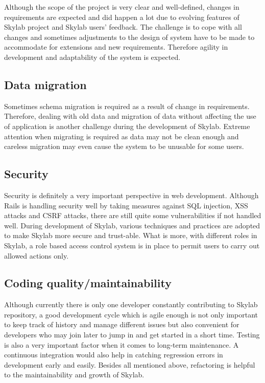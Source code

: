 Although the scope of the project is very clear and well-defined, changes in requirements are expected and did happen a lot due to evolving features of Skylab project and Skylab users' feedback. The challenge is to cope with all changes and sometimes adjustments to the design of system have to be made to accommodate for extensions and new requirements. Therefore agility in development and adaptability of the system is expected.

\subsection{Data migration}

Sometimes schema migration is required as a result of change in requirements. Therefore, dealing with old data and migration of data without affecting the use of application is another challenge during the development of Skylab. Extreme attention when migrating is required as data may not be clean enough and careless migration may even cause the system to be unusable for some users.

\subsection{Security}

Security is definitely a very important perspective in web development. Although Rails is handling security well by taking measures against SQL injection, XSS attacks and CSRF attacks, there are still quite some vulnerabilities if not handled well. During development of Skylab, various techniques and practices are adopted to make Skylab more secure and trust-able. What is more, with different roles in Skylab, a role based access control system is in place to permit users to carry out allowed actions only.

\subsection{Coding quality/maintainability}

Although currently there is only one developer constantly contributing to Skylab repository, a good development cycle which is agile enough is not only important to keep track of history and manage different issues but also convenient for developers who may join later to jump in and get started in a short time. Testing is also a very important factor when it comes to long-term maintenance. A continuous integration would also help in catching regression errors in development early and easily. Besides all mentioned above, refactoring is helpful to the maintainability and growth of Skylab.


